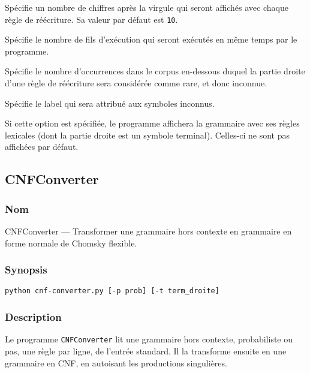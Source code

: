 \documentclass[12pt]{article}
\begin{document}
\begin{description}[style=nextline]
\item[\texttt{-p, --precision precision}] Sp\'ecifie un nombre de chiffres apr\`es
la virgule qui seront affich\'es avec chaque r\`egle de r\'e\'ecriture. Sa valeur par d\'efaut est
\texttt{10}.
\item[\texttt{-t, --nthreads threads}] Sp\'ecifie le nombre de fils d'ex\'ecution
qui seront ex\'ecut\'es en m\^eme temps par le programme.
\item[\texttt{-u, --unknown-threshold unknown\_threshold}] Sp\'ecifie le nombre
d'occurrences dans le corpus en-dessous duquel la partie droite d'une r\`egle de
r\'e\'ecriture sera consid\'er\'ee comme rare, et donc inconnue.
\item[\texttt{-s, --unknown-label unknown\_label}] Sp\'ecifie le label qui sera
attribu\'e aux symboles inconnus.
\item[\texttt{-l, --lexical}] Si cette option est sp\'ecifi\'ee, le programme
affichera la grammaire avec ses r\`egles lexicales (dont la partie droite est un
symbole terminal). Celles-ci ne sont pas affich\'ees par d\'efaut.
\end{description}

\subsection{CNFConverter}
\subsubsection{Nom}

CNFConverter --- Transformer une grammaire hors contexte en grammaire en forme
normale de Chomsky flexible.

\subsubsection{Synopsis}

{\ttfamily
\begin{verbatim}
python cnf-converter.py [-p prob] [-t term_droite]
\end{verbatim}
}

\subsubsection{Description}

Le programme \texttt{CNFConverter} lit une grammaire hors contexte, probabiliste
ou pas, une r\`egle par ligne, de l'entr\'ee standard.
Il la transforme ensuite en une grammaire en CNF, en autoisant les productions
singuli\`eres.
\end{document}
